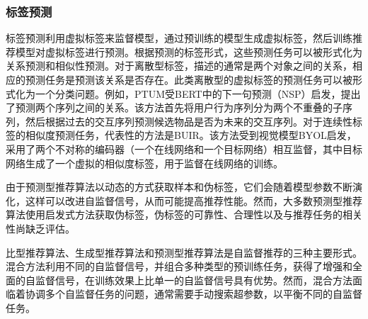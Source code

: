 \subsubsection{标签预测}
标签预测利用虚拟标签来监督模型，通过预训练的模型生成虚拟标签，然后训练推荐模型对虚拟标签进行预测。根据预测的标签形式，这些预测任务可以被形式化为关系预测和相似性预测。对于离散型标签，描述的通常是两个对象之间的关系，相应的预测任务是预测该关系是否存在。此类离散型的虚拟标签的预测任务可以被形式化为一个分类问题。例如，PTUM\cite{wu2020ptum}受BERT中的下一句预测（NSP）\cite{Devlin:2018:bert}启发，提出了预测两个序列之间的关系。该方法首先将用户行为序列分为两个不重叠的子序列，然后根据过去的交互序列预测候选物品是否为未来的交互序列。对于连续性标签的相似度预测任务，代表性的方法是BUIR\cite{lee2021bootstrapping}。该方法受到视觉模型BYOL\cite{BYOL:2020:NIPS}启发，采用了两个不对称的编码器（一个在线网络和一个目标网络）相互监督，其中目标网络生成了一个虚拟的相似度标签，用于监督在线网络的训练。

由于预测型推荐算法以动态的方式获取样本和伪标签，它们会随着模型参数不断演化，这样可以改进自监督信号，从而可能提高推荐性能。然而，大多数预测型推荐算法使用启发式方法获取伪标签，伪标签的可靠性、合理性以及与推荐任务的相关性尚缺乏评估。

比型推荐算法、生成型推荐算法和预测型推荐算法是自监督推荐的三种主要形式。混合方法\cite{bian2021contrastive,wang2023curriculum}利用不同的自监督信号，并组合多种类型的预训练任务，获得了增强和全面的自监督信号，在训练效果上比单一的自监督信号具有优势。然而，混合方法面临着协调多个自监督任务的问题，通常需要手动搜索超参数，以平衡不同的自监督任务。


